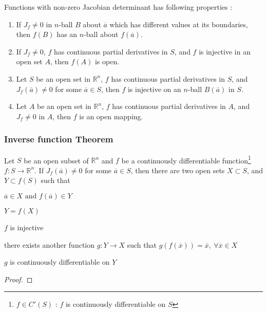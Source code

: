 \begin{commentary}
\begin{remark}[Properties]
	Functions with non-zero Jacobian determinant has following properties :
\begin{enumerate}
	\item If $J_f \ne 0$ in $n$-ball $B$ about $\overline{a}$ which has different values at its boundaries, then $f(B)$ has an $n$-ball about $f(\overline{a})$.
	\item If $J_f \ne 0$, $f$ has continuous partial derivatives in $S$, and $f$ is injective in an open set $A$, then $f(A)$ is open.
	\item Let $S$ be an open set in $\mathbb{R}^n$, $f$ has continuous partial derivatives in $S$, and $J_f(\overline{a}) \ne 0$ for some $\overline{a} \in S$, then $f$ is injective on an $n$-ball $B(\overline{a})$ in $S$.
	\item Let $A$ be an open set in $\mathbb{R}^n$, $f$ has continuous partial derivatives in $A$, and $J_f \ne 0$ in $A$, then $f$ is an open mapping.
\end{enumerate}
\end{remark}
\end{commentary}

\subsubsection{Inverse function Theorem}
\begin{theorem}
Let $S$ be an open subset of $\mathbb{R}^n$ and $f$ be a continuously differentiable function\footnote{$f \in C'(S)$ : $f$ is continuously differentiable on $S$} $f : S \to \mathbb{R}^n$. If $J_f(\overline{a}) \ne 0$ for some $\overline{a} \in S$, then there are two open sets $X \subset S$, and $Y \subset f(S)$ such that \begin{enumerate*} \item $\overline{a} \in X \text{ and } f(\overline{a}) \in Y$ \item $Y = f(X)$ \item $f$ is injective \item there exists another function $g : Y \to X$ such that $g(f(\overline{x})) = \overline{x},\ \forall \overline{x} \in X$ \item $g$ is continuously differentiable on $Y$ \end{enumerate*}
\end{theorem}
\begin{proof}
\end{proof}

